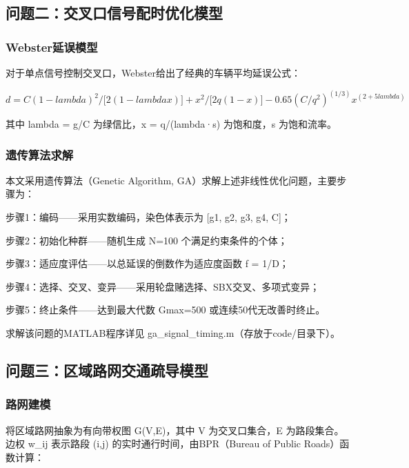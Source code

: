 \subsection{问题二：交叉口信号配时优化模型}

\subsubsection{Webster延误模型}

对于单点信号控制交叉口，Webster给出了经典的车辆平均延误公式：

\begin{equation}
  d = C(1-lambda)^2/\lbrack 2(1-lambda x)\rbrack  + x^2/\lbrack 2q(1-x)\rbrack  - 0.65(C/q^2)^(1/3)x^(2+5lambda)
  \label{eq:4}
\end{equation}

其中 lambda = g/C 为绿信比，x = q/(lambda·s) 为饱和度，s 为饱和流率。

\subsubsection{遗传算法求解}

本文采用遗传算法（Genetic Algorithm, GA）求解上述非线性优化问题，主要步骤为：

步骤1：编码——采用实数编码，染色体表示为 [g1, g2, g3, g4, C]；

步骤2：初始化种群——随机生成 N=100 个满足约束条件的个体；

步骤3：适应度评估——以总延误的倒数作为适应度函数 f = 1/D；

步骤4：选择、交叉、变异——采用轮盘赌选择、SBX交叉、多项式变异；

步骤5：终止条件——达到最大代数 Gmax=500 或连续50代无改善时终止。

求解该问题的MATLAB程序详见 ga\_signal\_timing.m（存放于code/目录下）。

\subsection{问题三：区域路网交通疏导模型}

\subsubsection{路网建模}

将区域路网抽象为有向带权图 G(V,E)，其中 V 为交叉口集合，E 为路段集合。边权 w\_ij 表示路段 (i,j) 的实时通行时间，由BPR（Bureau of Public Roads）函数计算：

